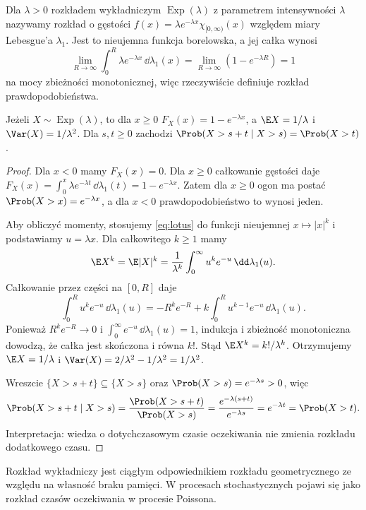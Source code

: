 \begin{definicja}
Dla $\lambda>0$ rozkładem wykładniczym $\operatorname{Exp}(\lambda)$
z parametrem intensywności $\lambda$ nazywamy rozkład
o gęstości $f(x)=\lambda e^{-\lambda x}\chi_{[0,\infty)}(x)$
względem miary Lebesgue'a $\lambda_1$.
Jest to nieujemna funkcja borelowska, a jej całka wynosi
\[
\lim_{R\to\infty}\int_0^R\lambda e^{-\lambda x}\,
\dd\lambda_1(x)=\lim_{R\to\infty}(1-e^{-\lambda R})=1
\]
na mocy zbieżności monotonicznej, więc rzeczywiście definiuje
rozkład prawdopodobieństwa.
\end{definicja}

\begin{stwierdzenie}
Jeżeli $X\sim\operatorname{Exp}(\lambda)$, to dla $x\geq0$
$F_X(x)=1-e^{-\lambda x}$, a
$\E X=1/\lambda$ i $\Var(X)=1/\lambda^2$.
Dla $s,t\geq0$ zachodzi
$\Prob(X>s+t\mid X>s)=\Prob(X>t)$.
\end{stwierdzenie}
\begin{proof}
Dla $x<0$ mamy $F_X(x)=0$. Dla $x\geq0$ całkowanie
gęstości daje
$F_X(x)=\int_0^x\lambda e^{-\lambda t}\,\dd\lambda_1(t)
=1-e^{-\lambda x}$.
Zatem dla $x\geq0$ ogon ma postać
$\Prob(X>x)=e^{-\lambda x}$, a dla $x<0$
prawdopodobieństwo to wynosi jeden.

Aby obliczyć momenty, stosujemy \eqref{eq:lotus}
do funkcji nieujemnej $x\mapsto |x|^k$ i podstawiamy
$u=\lambda x$. Dla całkowitego $k\geq1$ mamy
\[
\E X^k=\E|X|^k
=\frac1{\lambda^k}\int_0^\infty u^ke^{-u}\,\dd\lambda_1(u).
\]
Całkowanie przez części na $[0,R]$ daje
\[
\int_0^R u^ke^{-u}\,\dd\lambda_1(u)
=-R^ke^{-R}+k\int_0^R u^{k-1}e^{-u}\,\dd\lambda_1(u).
\]
Ponieważ $R^ke^{-R}\to0$ i
$\int_0^\infty e^{-u}\,\dd\lambda_1(u)=1$,
indukcja i zbieżność monotoniczna dowodzą, że całka
jest skończona i równa $k!$. Stąd $\E X^k=k!/\lambda^k$.
Otrzymujemy $\E X=1/\lambda$ i
$\Var(X)=2/\lambda^2-1/\lambda^2=1/\lambda^2$.

Wreszcie $\{X>s+t\}\subseteq\{X>s\}$ oraz
$\Prob(X>s)=e^{-\lambda s}>0$, więc
\[
\Prob(X>s+t\mid X>s)
=\frac{\Prob(X>s+t)}{\Prob(X>s)}
=\frac{e^{-\lambda(s+t)}}{e^{-\lambda s}}
=e^{-\lambda t}=\Prob(X>t).
\]
Interpretacja: wiedza o dotychczasowym czasie oczekiwania
nie zmienia rozkładu dodatkowego czasu.
\end{proof}

\begin{uwaga}
Rozkład wykładniczy jest ciągłym odpowiednikiem rozkładu
geometrycznego ze względu na własność braku pamięci.
W procesach stochastycznych pojawi się jako rozkład czasów
oczekiwania w procesie Poissona.
\end{uwaga}

